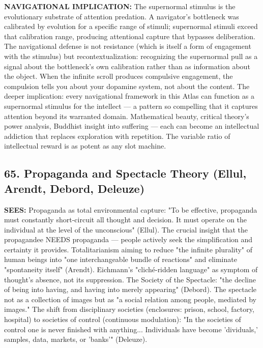 \textbf{NAVIGATIONAL IMPLICATION:} The supernormal stimulus is the evolutionary substrate of attention predation. A navigator's bottleneck was calibrated by evolution for a specific range of stimuli; supernormal stimuli exceed that calibration range, producing attentional capture that bypasses deliberation. The navigational defense is not resistance (which is itself a form of engagement with the stimulus) but recontextualization: recognizing the supernormal pull as a signal about the bottleneck's own calibration rather than as information about the object. When the infinite scroll produces compulsive engagement, the compulsion tells you about your dopamine system, not about the content. The deeper implication: every navigational framework in this Atlas can function as a supernormal stimulus for the intellect — a pattern so compelling that it captures attention beyond its warranted domain. Mathematical beauty, critical theory's power analysis, Buddhist insight into suffering — each can become an intellectual addiction that replaces exploration with repetition. The variable ratio of intellectual reward is as potent as any slot machine.


\bigskip\noindent\makebox[\textwidth]{\color{rulegray}\rule{5cm}{0.3pt}}\bigskip


\subsection*{65. Propaganda and Spectacle Theory (Ellul, Arendt, Debord, Deleuze)}


\textbf{SEES:} Propaganda as total environmental capture: "To be effective, propaganda must constantly short-circuit all thought and decision. It must operate on the individual at the level of the unconscious" (Ellul). The crucial insight that the propagandee NEEDS propaganda — people actively seek the simplification and certainty it provides. Totalitarianism aiming to reduce "the infinite plurality" of human beings into "one interchangeable bundle of reactions" and eliminate "spontaneity itself" (Arendt). Eichmann's "cliché-ridden language" as symptom of thought's absence, not its suppression. The Society of the Spectacle: "the decline of being into having, and having into merely appearing" (Debord). The spectacle not as a collection of images but as "a social relation among people, mediated by images." The shift from disciplinary societies (enclosures: prison, school, factory, hospital) to societies of control (continuous modulation): "In the societies of control one is never finished with anything... Individuals have become 'dividuals,' samples, data, markets, or 'banks'" (Deleuze).



